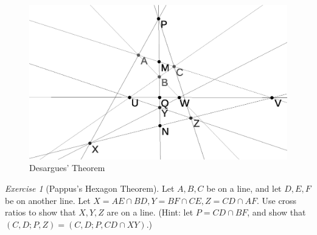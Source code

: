 \documentclass[letterpaper,11pt]{article}
\theoremstyle{definition}
\theoremstyle{remark}
\newtheorem{exer}{Exercise}
\begin{document}
\begin{figure}[!htb]
\centering
\includegraphics[scale=0.7]{desargues.eps}
\caption{Desargues' Theorem}
\end{figure}

\begin{exer}[Pappus's Hexagon Theorem] Let $A,B,C$ be on a line, and let $D,E,F$ be on another line. Let $X = AE\cap BD, Y = BF\cap CE, Z = CD\cap AF$. Use cross ratios to show that $X,Y,Z$ are on a line. (Hint: let $P = CD\cap BF$, and show that $(C,D;P,Z) = (C,D;P,CD\cap XY)$.)
\end{exer}
\end{document}
